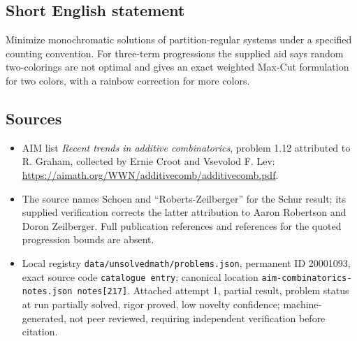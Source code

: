 \documentclass[11pt]{article}
\begin{document}
\subsection{Short English statement}
Minimize monochromatic solutions of partition-regular systems under a specified counting convention. For three-term progressions the supplied aid says random two-colorings are not optimal and gives an exact weighted Max-Cut formulation for two colors, with a rainbow correction for more colors.
\subsection{Sources}
\begin{itemize}
\item AIM list \emph{Recent trends in additive combinatorics}, problem 1.12 attributed to R. Graham, collected by Ernie Croot and Vsevolod F. Lev: \url{https://aimath.org/WWN/additivecomb/additivecomb.pdf}.
\item The source names Schoen and ``Roberts-Zeilberger'' for the Schur result; its supplied verification corrects the latter attribution to Aaron Robertson and Doron Zeilberger. Full publication references and references for the quoted progression bounds are absent.
\item Local registry \texttt{data/unsolvedmath/problems.json}, permanent ID 20001093, exact source code \texttt{catalogue entry}; canonical location \texttt{aim-combinatorics-notes.json notes[217]}. Attached attempt 1, partial result, problem status at run partially solved, rigor proved, low novelty confidence; machine-generated, not peer reviewed, requiring independent verification before citation.
\end{itemize}
\end{document}
